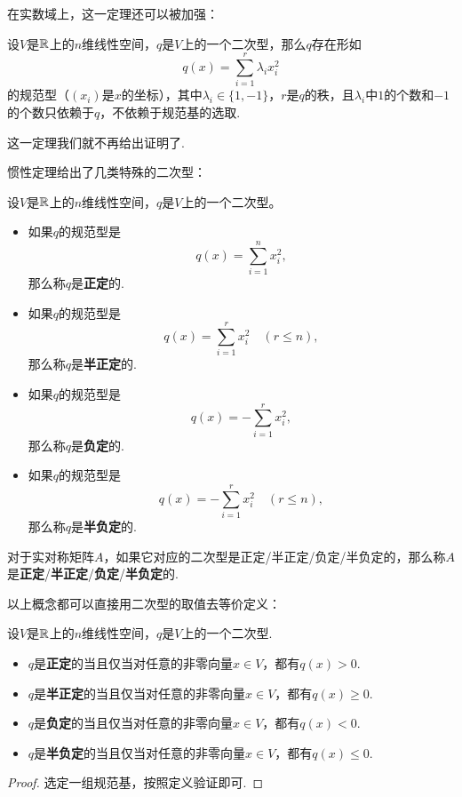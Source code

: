 在实数域上，这一定理还可以被加强：

\begin{theorem}[惯性定理]\label{thm:inertia-theorem}
    设$V$是$\mathbb{R}$上的$n$维线性空间，$q$是$V$上的一个二次型，那么$q$存在形如
    \[
        q(x)=\sum_{i=1}^r \lambda_i x_i^2
    \]
    的规范型（$(x_i)$是$x$的坐标），其中$\lambda_i\in\{1,-1\}$，$r$是$q$的秩，且$\lambda_i$中$1$的个数和$-1$的个数只依赖于$q$，不依赖于规范基的选取. 
\end{theorem}

这一定理我们就不再给出证明了. 

惯性定理给出了几类特殊的二次型：

\begin{definition}\label{def:positive-definite}
    设$V$是$\mathbb{R}$上的$n$维线性空间，$q$是$V$上的一个二次型。
    \begin{itemize}
        \item 如果$q$的规范型是
        \[
            q(x)=\sum_{i=1}^n x_i^2,
        \]
        那么称$q$是\textbf{正定}的. 
        \item 如果$q$的规范型是
        \[
            q(x)=\sum_{i=1}^r x_i^2\quad(r\leq n),
        \]
        那么称$q$是\textbf{半正定}的. 
        \item 如果$q$的规范型是
        \[
            q(x)=-\sum_{i=1}^r x_i^2,
        \]
        那么称$q$是\textbf{负定}的. 
        \item 如果$q$的规范型是
        \[
            q(x)=-\sum_{i=1}^r x_i^2\quad(r\leq n),
        \]
        那么称$q$是\textbf{半负定}的. 
    \end{itemize}

对于实对称矩阵$A$，如果它对应的二次型是正定/半正定/负定/半负定的，那么称$A$是\textbf{正定}/\textbf{半正定}/\textbf{负定}/\textbf{半负定}的. 
\end{definition}

以上概念都可以直接用二次型的取值去等价定义：
\begin{proposition}\label{prop:positive-definite}
    设$V$是$\mathbb{R}$上的$n$维线性空间，$q$是$V$上的一个二次型. 
    \begin{itemize}
        \item $q$是\textbf{正定}的当且仅当对任意的非零向量$x\in V$，都有$q(x)>0$. 
        \item $q$是\textbf{半正定}的当且仅当对任意的非零向量$x\in V$，都有$q(x)\geq 0$. 
        \item $q$是\textbf{负定}的当且仅当对任意的非零向量$x\in V$，都有$q(x)<0$. 
        \item $q$是\textbf{半负定}的当且仅当对任意的非零向量$x\in V$，都有$q(x)\leq 0$. 
    \end{itemize}
\end{proposition}
\begin{proof}
    选定一组规范基，按照定义验证即可. 
\end{proof}

